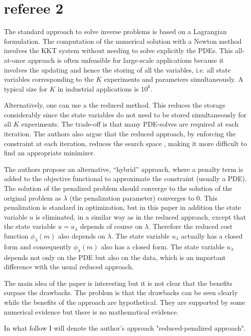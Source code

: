 \documentclass[12pt]{article}
\begin{document}
\section{referee 2}
The standard approach to solve inverse problems is based on a Lagrangian formulation. The computation of the numerical solution with a Newton method involves the 
KKT system without needing to solve explicitly the PDEs. This all-at-once approach is often unfeasible for large-scale applications because it involves the updating and hence the storing of all the variables, i.e. all state variables corresponding to the $K$ experiments and parameters simultaneously. A typical size for $K$ in industrial applications is $10^6$. 

Alternatively, one can use a the reduced method. 
This reduces the storage considerably since the state variables do not need to be stored simultaneously for all $K$ experiments. 
The trade-off is that many PDE-solves are required at each iteration. 
The authors also argue that the reduced approach, by enforcing the constraint at each iteration, reduces the search space , making it more difficult to find an appropriate minimizer. 

The authors propose an alternative, ``hybrid'' approach, where a penalty term is added to the objective functional to approximate the constraint (usually a PDE). 
The solution of the penalized problem should converge to the solution of the original problem as $\lambda$ (the penalization parameter) converges to $0$. 
This penalization is standard in optimization, but in this paper in addition the state variable $u$ is eliminated, in a similar way as in the reduced approach, except that the state variable $u=u_\lambda$ depends of course on $\lambda$. Therefore the reduced cost function $\phi_\lambda(m)$ also depends on $\lambda$. The state variable $u_\lambda$ actually has a closed form and consequently $\phi_\lambda(m)$ also has a closed form. The state variable $u_\lambda$ depends not only on the PDE but also on the data, which is an important difference with the usual reduced approach. 

The main idea of the paper is interesting but it is not clear that the benefits surpass the drawbacks. The problem is that the drawbacks can be seen clearly while the benefits of the approach are hypothetical. They are supported by some numerical evidence but there is no mathematical evidence.

In what follow I will denote the author's approach "reduced-penalized approach". 
\end{document}
